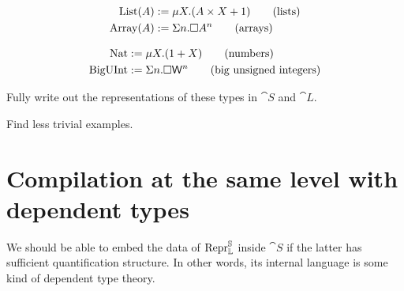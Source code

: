\begin{align}
  \mathrm{List}(A)  & := \mu X . (A \times X + 1) \tag{lists} \\
  \mathrm{Array}(A) & := \Sigma n . \square A ^n \tag{arrays}
\end{align}

\begin{align}
  \mathrm{Nat}     & := \mu X . (1 + X) \tag{numbers}                             \\
  \mathrm{BigUInt} & := \Sigma n . \square \mathsf{W} ^n \tag{big unsigned integers}
\end{align}

Fully write out the representations of these types in $\cat S$ and $\cat L$.

Find less trivial examples.





\section{Compilation at the same level with dependent types}

We should be able to embed the data of $\mathrm{Repr} ^{\mathbb S} _{\mathbb L}$ inside $\cat
  S$ if the latter has sufficient quantification structure. In other words, its
internal language is some kind of dependent type theory.

